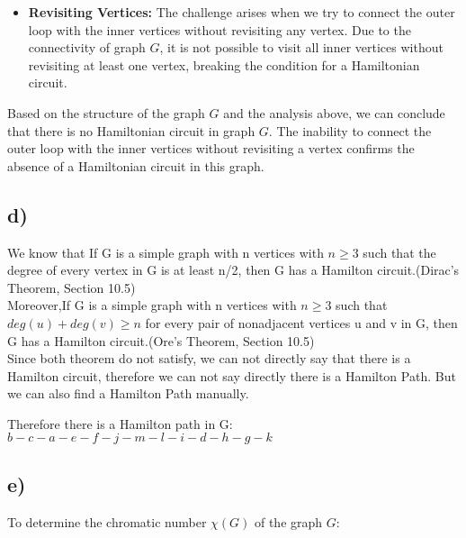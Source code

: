 \documentclass[12pt]{article}
\begin{document}
\begin{itemize}
    \item \textbf{Revisiting Vertices:} The challenge arises when we try to connect the outer loop with the inner vertices without revisiting any vertex. Due to the connectivity of graph \( G \), it is not possible to visit all inner vertices without revisiting at least one vertex, breaking the condition for a Hamiltonian circuit.
\end{itemize}

Based on the structure of the graph \( G \) and the analysis above, we can conclude that there is no Hamiltonian circuit in graph \( G \). The inability to connect the outer loop with the inner vertices without revisiting a vertex confirms the absence of a Hamiltonian circuit in this graph.


\subsection*{d)}

We know that If G is a simple graph with n vertices with \(n \geq 3\) such that the
degree of every vertex in G is at least n/2, then G has a Hamilton circuit.(Dirac's Theorem, Section 10.5)\\

Moreover,If G is a simple graph with n vertices with \(n \geq 3\) such that
\( deg(u) + deg(v) \geq n \) for every pair of nonadjacent vertices u and v in G, then G has a
Hamilton circuit.(Ore's Theorem, Section 10.5)\\

Since both theorem do not satisfy, we can not directly say that there is a Hamilton circuit, therefore we can not say directly there is a Hamilton Path. But we can also find a Hamilton Path manually.

Therefore there is a Hamilton path in G: \(  b - c - a - e - f - j - m - l - i-d-h-g-k \)

\subsection*{e)}

To determine the chromatic number \( \chi(G) \) of the graph \( G \):
\end{document}
